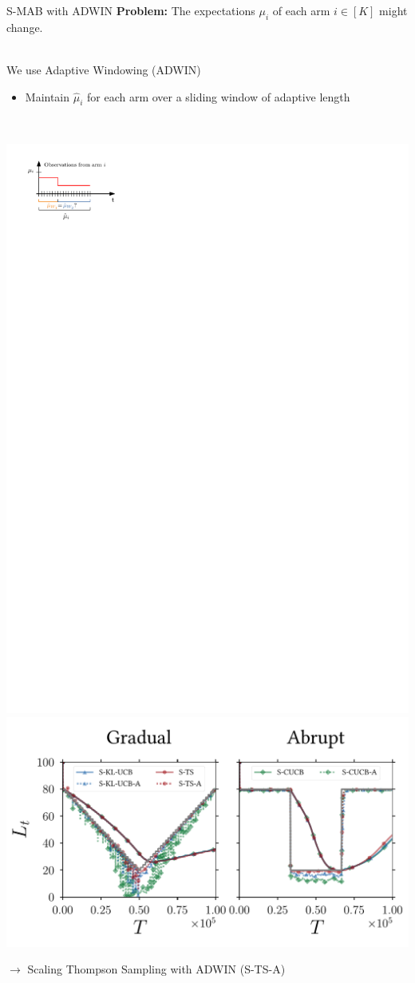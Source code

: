 \documentclass[16pt,usenames,dvipsnames, notheorems]{beamer}
\theoremstyle{definition}
\theoremstyle{example}
\theoremstyle{plain}
\begin{document}
\begin{frame}{S-MAB with ADWIN}
\small 
\textbf{Problem:} The expectations $\mu_i$ of each arm $i \in [K]$ might change. 

~\\ 

We use Adaptive Windowing (ADWIN) \citep{DBLP:conf/sdm/BifetG07}
\begin{itemize}
	\item Maintain $\hat{\mu}_i$ for each arm over a sliding window of adaptive length
\end{itemize}

~\\

\begin{overprint}
	 \includegraphics[width=0.4\linewidth]{figures/adwin_1-compressed.pdf}
	\includegraphics[width=0.6\linewidth]{figures/gradual_abrupt_regret_top-compressed.pdf}
\end{overprint}
$\rightarrow$ Scaling Thompson Sampling with ADWIN (S-TS-A)
\end{frame}
\end{document}
